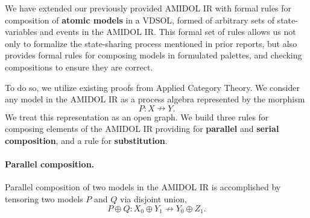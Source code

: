 \documentclass[12pt]{galois-whitepaper}
\begin{document}
We have extended our previously provided AMIDOL IR with formal rules
for composition of \textbf{atomic models} in a VDSOL, formed of
arbitrary sets of state-variables and events in the AMIDOL IR.  This
formal set of rules allows us not only to formalize the state-sharing
process mentioned in prior reports, but also provides formal rules for
composing models in formulated palettes, and checking compositions to
ensure they are correct.

To do so, we utilize existing proofs from Applied Category Theory.  We
consider any model in the AMIDOL IR as a process algebra represented
by the morphism \[P: X \nrightarrow Y.\]  We treat this representation
as an open graph.  We build three rules for composing elements of the
AMIDOL IR providing for \textbf{parallel} and \textbf{serial
  composition}, and a rule for \textbf{substitution}.

  \paragraph{Parallel composition.}   Parallel composition of two
  models in the AMIDOL IR is accomplished by tensoring two models $P$
  and $Q$ via disjoint union, \[P \oplus Q: X_0 \oplus Y_1
    \nrightarrow Y_0 \oplus Z_1.\]  
\end{document}
